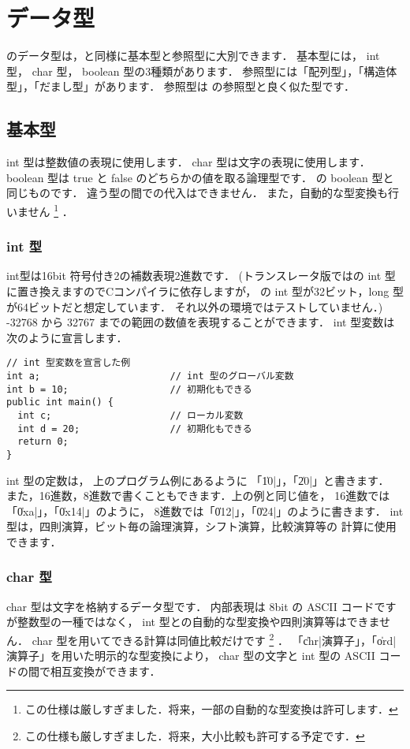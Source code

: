 \section{データ型}

\cmml のデータ型は，\javal と同様に基本型と参照型に大別できます．
基本型には， int 型， char 型， boolean 型の3種類があります．
参照型には「配列型」，「構造体型」，「だまし型」があります．
参照型は \javal の参照型と良く似た型です．

\subsection{基本型}

int 型は整数値の表現に使用します．
char 型は文字の表現に使用します．
boolean 型は true と false のどちらかの値を取る論理型です．
\javal の boolean 型と同じものです．
違う型の間での代入はできません．
また，自動的な型変換も行いません
\footnote{この仕様は厳しすぎました．将来，一部の自動的な型変換は許可します．}
．

\subsubsection{int 型}
int型は16bit 符号付き2の補数表現2進数です．
(トランスレータ版では\cl の int 型に置き換えますのでCコンパイラに依存しますが，
{\cl}の int 型が32ビット，long 型が64ビットだと想定しています．
それ以外の環境ではテストしていません．)
-32768 から 32767 までの範囲の数値を表現することができます．
int 型変数は次のように宣言します．

\begin{mylist}
\begin{verbatim}
// int 型変数を宣言した例
int a;                       // int 型のグローバル変数
int b = 10;                  // 初期化もできる
public int main() {
  int c;                     // ローカル変数
  int d = 20;                // 初期化もできる
  return 0;
}
\end{verbatim}
\end{mylist}

int 型の定数は，
上のプログラム例にあるように 「\|10|」，「\|20|」と書きます．
また，16進数，8進数で書くこともできます．上の例と同じ値を，
16進数では「\|0xa|」，「\|0x14|」のように，
8進数では「\|012|」，「\|024|」のように書きます．
int 型は，四則演算，ビット毎の論理演算，シフト演算，比較演算等の
計算に使用できます．

\subsubsection{char 型}
char 型は文字を格納するデータ型です．
内部表現は 8bit の ASCII コードですが整数型の一種ではなく，
int 型との自動的な型変換や四則演算等はできません．
char 型を用いてできる計算は同値比較だけです
\footnote{この仕様も厳しすぎました．将来，大小比較も許可する予定です．}
．
「\|chr|演算子」，「\|ord|演算子」を用いた明示的な型変換により，
char 型の文字と int 型の ASCII コードの間で相互変換ができます．

